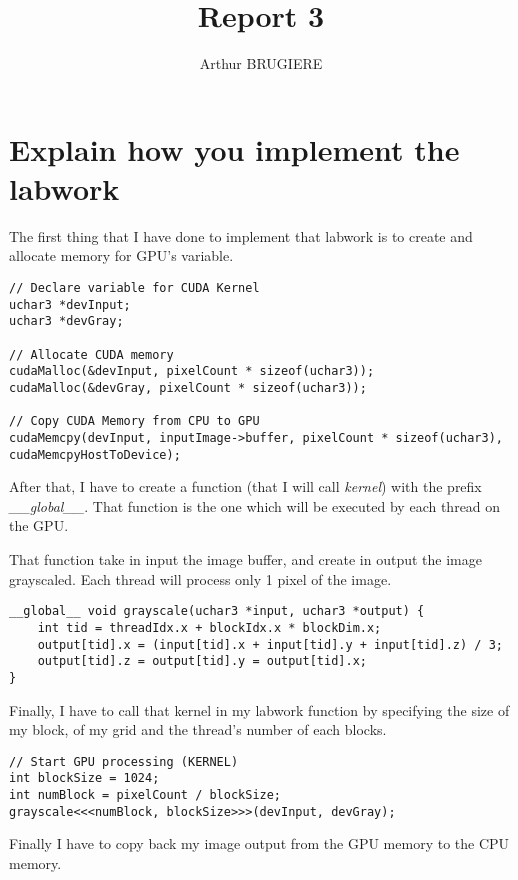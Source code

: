 \documentclass[11pt]{article} %
\title{Report 3}
\author{Arthur BRUGIERE}
\begin{document}
\maketitle

\section{Explain how you implement the labwork}

The first thing that I have done to implement that labwork is to create and allocate memory for GPU's variable.

\lstset{language=C}
\begin{lstlisting}
// Declare variable for CUDA Kernel
uchar3 *devInput;
uchar3 *devGray;

// Allocate CUDA memory
cudaMalloc(&devInput, pixelCount * sizeof(uchar3));
cudaMalloc(&devGray, pixelCount * sizeof(uchar3));

// Copy CUDA Memory from CPU to GPU
cudaMemcpy(devInput, inputImage->buffer, pixelCount * sizeof(uchar3), cudaMemcpyHostToDevice);
\end{lstlisting}

After that, I have to create a function (that I will call {\it kernel}) with the prefix {\it \_\_global\_\_}. That function is the one which will be executed by each thread on the GPU.

That function take in input the image buffer, and create in output the image grayscaled. Each thread will process only 1 pixel of the image.

\lstset{language=C}
\begin{lstlisting}
__global__ void grayscale(uchar3 *input, uchar3 *output) {
    int tid = threadIdx.x + blockIdx.x * blockDim.x;
    output[tid].x = (input[tid].x + input[tid].y + input[tid].z) / 3;
    output[tid].z = output[tid].y = output[tid].x;
}
\end{lstlisting}

Finally, I have to call that kernel in my labwork function by specifying the size of my block, of my grid and the thread's number of each blocks.

\lstset{language=C}
\begin{lstlisting}
// Start GPU processing (KERNEL)
int blockSize = 1024;
int numBlock = pixelCount / blockSize;
grayscale<<<numBlock, blockSize>>>(devInput, devGray);
\end{lstlisting}

Finally I have to copy back my image output from the GPU memory to the CPU memory.
\end{document}
